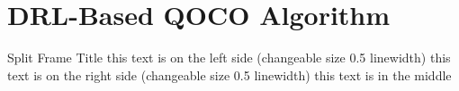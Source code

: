 \section{DRL-Based QOCO Algorithm}

\begin{splitframe}{0.5}{0.5}{Split Frame Title}
{this text is on the left side (changeable size 0.5 linewidth)}
{this text is on the right side (changeable size 0.5 linewidth)}
this text is in the middle
\end{splitframe}